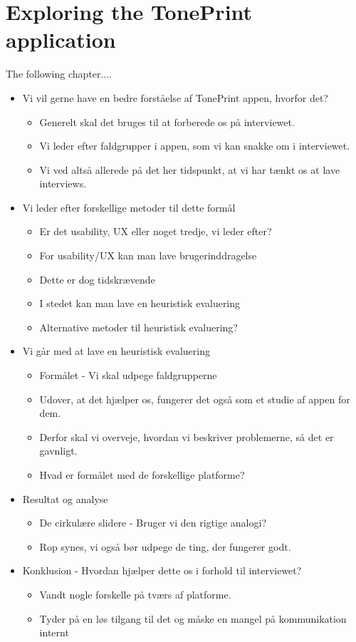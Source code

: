 \chapter{Exploring the TonePrint application}
\label{HeursiticEvaluation}
The following chapter....

\begin{itemize}
	\item Vi vil gerne have en bedre forståelse af TonePrint appen, hvorfor det?
	\begin{itemize}
		\item Generelt skal det bruges til at forberede os på interviewet.
		\item Vi leder efter faldgrupper i appen, som vi kan snakke om i interviewet.
		\item Vi ved altså allerede på det her tidspunkt, at vi har tænkt os at lave interviews.
	\end{itemize}
	\item Vi leder efter forskellige metoder til dette formål
	\begin{itemize}
		\item Er det usability, UX eller noget tredje, vi leder efter?
		\item For usability/UX kan man lave brugerinddragelse
		\item Dette er dog tidskrævende
		\item I stedet kan man lave en heuristisk evaluering
		\item Alternative metoder til heuristisk evaluering?
	\end{itemize}
	\item Vi går med at lave en heuristisk evaluering
	\begin{itemize}
		\item Formålet - Vi skal udpege faldgrupperne
		\item Udover, at det hjælper os, fungerer det også som et studie af appen for dem.
		\item Derfor skal vi overveje, hvordan vi beskriver problemerne, så det er gavnligt.
		\item Hvad er formålet med de forskellige platforme?
	\end{itemize}
	\item Resultat og analyse
	\begin{itemize}
		\item De cirkulære slidere - Bruger vi den rigtige analogi?
		\item Rop synes, vi også bør udpege de ting, der fungerer godt.
	\end{itemize}
	\item Konklusion - Hvordan hjælper dette os i forhold til interviewet?
	\begin{itemize}
		\item Vandt nogle forskelle på tværs af platforme.
		\item Tyder på en løs tilgang til det og måske en mangel på kommunikation internt
	\end{itemize}
\end{itemize}


